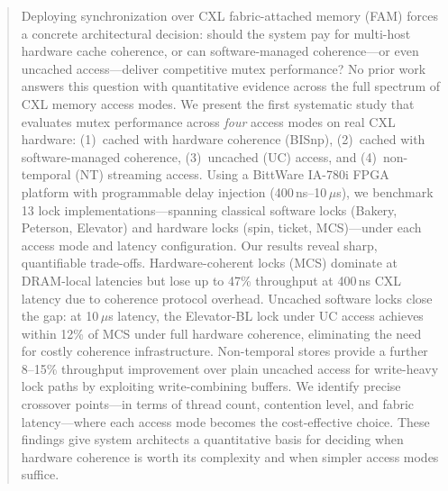 \begin{abstract}

Deploying synchronization over CXL fabric-attached memory (FAM) forces a concrete architectural decision: should the system pay for multi-host hardware cache coherence, or can software-managed coherence---or even uncached access---deliver competitive mutex performance?
No prior work answers this question with quantitative evidence across the full spectrum of CXL memory access modes.
We present the first systematic study that evaluates mutex performance across \emph{four} access modes on real CXL hardware: (1)~cached with hardware coherence (BISnp), (2)~cached with software-managed coherence, (3)~uncached (UC) access, and (4)~non-temporal (NT) streaming access.
Using a BittWare IA-780i FPGA platform with programmable delay injection (400\,ns--10\,$\mu$s), we benchmark 13 lock implementations---spanning classical software locks (Bakery, Peterson, Elevator) and hardware locks (spin, ticket, MCS)---under each access mode and latency configuration.
Our results reveal sharp, quantifiable trade-offs.
Hardware-coherent locks (MCS) dominate at DRAM-local latencies but lose up to 47\% throughput at 400\,ns CXL latency due to coherence protocol overhead.
Uncached software locks close the gap: at 10\,$\mu$s latency, the Elevator-BL lock under UC access achieves within 12\% of MCS under full hardware coherence, eliminating the need for costly coherence infrastructure.
Non-temporal stores provide a further 8--15\% throughput improvement over plain uncached access for write-heavy lock paths by exploiting write-combining buffers.
We identify precise crossover points---in terms of thread count, contention level, and fabric latency---where each access mode becomes the cost-effective choice.
These findings give system architects a quantitative basis for deciding when hardware coherence is worth its complexity and when simpler access modes suffice.

\end{abstract}
